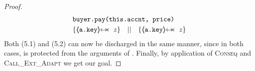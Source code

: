 \begin{proof}
\begin{align*}
		  		& \prg{buyer.pay(this.accnt, price)}\ \\  
		  		& \{ {\protectedFrom{\prg{a.key}}{z}}  \} \ \ \  || \ \ \ \{ {\protectedFrom{\prg{a.key}}{z}} \}
\end{align*}
\normalsize
Both (5.1) and (5.2) can now be discharged in the same manner, since in both cases,  is protected from the arguments of .  Finally, by application of \textsc{Conseq} and \textsc{Call\_Ext\_Adapt} we get our goal.
%
\end{proof}




